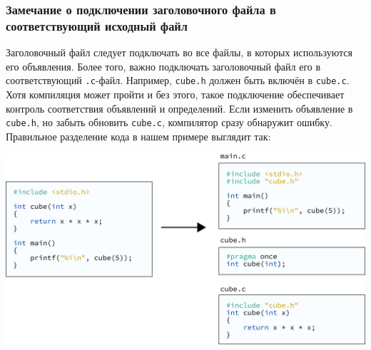 \documentclass{article}
\begin{document}
\subsubsection*{Замечание о подключении заголовочного файла в соответствующий исходный файл}
Заголовочный файл следует подключать во все файлы, в которых используются его объявления. Более того, важно подключать заголовочный файл его в соответствующий \texttt{.c}-файл. Например, \texttt{cube.h} должен быть включён в \texttt{cube.c}. Хотя компиляция может пройти и без этого, такое подключение обеспечивает контроль соответствия объявлений и определений. Если изменить объявление в \texttt{cube.h}, но забыть обновить \texttt{cube.c}, компилятор сразу обнаружит ошибку. Правильное разделение кода в нашем примере выглядит так:
\begin{center}
\includegraphics[scale=0.85]{../images/06main_cube_separate3b.png}
\end{center}
\end{document}
